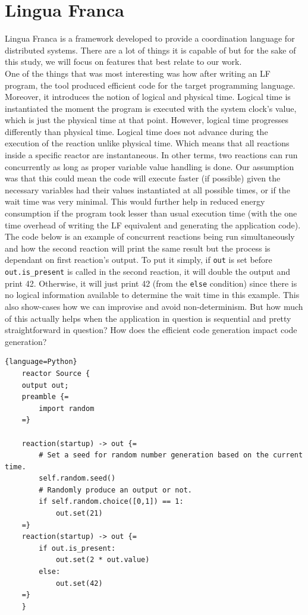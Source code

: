 \section{Lingua Franca}
Lingua Franca is a framework developed to provide a coordination language for distributed systems. There are a 
lot of things it is capable of but for the sake of this study, we will focus on features that best relate to 
our work. \\
One of the things that was most interesting was how after writing an LF program, the tool produced efficient code 
for the target programming language. Moreover, it introduces the notion of logical and physical time. Logical time 
is instantiated the moment the program is executed with the system clock's value, which is just the physical time 
at that point. However, logical time progresses differently than physical time. Logical time does not advance 
during the execution of the reaction unlike physical time. Which means that all reactions inside a specific reactor 
are instantaneous. In other terms, two reactions can run concurrently as long as proper variable value handling is done. 
Our assumption was that this could mean the code will execute faster (if possible) given the necessary variables 
had their values instantiated at all possible times, or if the wait time was very minimal. This would further 
help in reduced energy consumption if the program took lesser than usual execution time (with the one time overhead 
of writing the LF equivalent and generating the application code). The code below \cite{lfsource} is an example of concurrent 
reactions being run simultaneously and how the second reaction will print the same result but the process 
 is dependant on 
first reaction's output. To put it simply, if \texttt{out} is set before \texttt{out.is\_present} is called in the 
second reaction, it will double the output and print 42. Otherwise, it will just print 42 (from the \texttt{else} condition) since there is no logical 
information available to determine the wait time in this example. This also show-cases how we can improvise and 
avoid non-determinism. But how much of this actually helps when the application in question is sequential 
and pretty straightforward in question? How does the efficient code generation impact code generation? \\

\begin{lstlisting}{language=Python}
    reactor Source {
    output out;
    preamble {=
        import random
    =}

    reaction(startup) -> out {=
        # Set a seed for random number generation based on the current time.
        self.random.seed()
        # Randomly produce an output or not.
        if self.random.choice([0,1]) == 1:
            out.set(21)
    =}
    reaction(startup) -> out {=
        if out.is_present:
            out.set(2 * out.value)
        else:
            out.set(42)
    =}
    }
\end{lstlisting}

